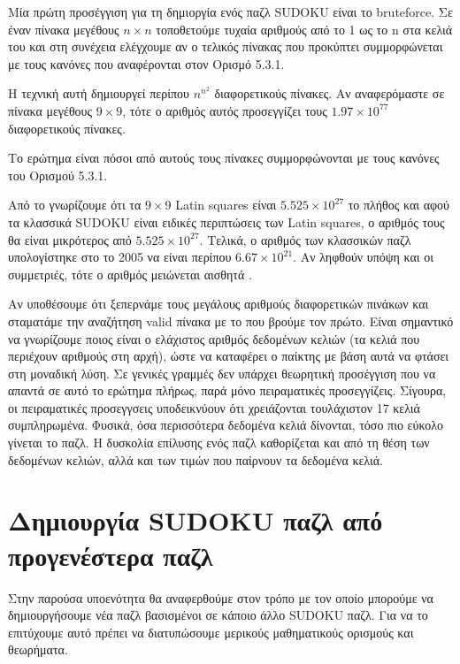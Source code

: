 \documentclass[12pt]{book}
\theoremstyle{definition}
\begin{document}
Μία πρώτη προσέγγιση για τη δημιοργία ενός παζλ SUDOKU είναι το bruteforce. Σε έναν πίνακα μεγέθους \(n \times n\) τοποθετούμε τυχαία αριθμούς από το 1 ως το n στα κελιά του και στη συνέχεια ελέγχουμε αν ο τελικός πίνακας που προκύπτει συμμορφώνεται με τους κανόνες που αναφέρονται στον Ορισμό 5.3.1. \par

Η τεχνική αυτή δημιουργεί περίπου \(n^{n^2}\) διαφορετικούς πίνακες. Αν αναφερόμαστε σε πίνακα μεγέθους \(9 \times 9\), τότε ο αριθμός αυτός προσεγγίζει τους \(1.97\times10^{77}\) διαφορετικούς πίνακες. \par

Το ερώτημα είναι πόσοι από αυτούς τους πίνακες συμμορφώνονται με τους κανόνες του Ορισμού 5.3.1. \par

Από το \cite{6} γνωρίζουμε ότι τα \(9 \times 9\) Latin squares είναι \(5.525\times10^{27}\) το πλήθος και αφού τα κλασσικά SUDOKU είναι ειδικές περιπτώσεις των Latin squares, ο αριθμός τους θα είναι μικρότερος από \(5.525\times10^{27}\). Τελικά, ο αριθμός των κλασσικών παζλ υπολογίστηκε στο \cite{7} το 2005 να είναι περίπου \(6.67\times10^{21}\). Αν ληφθούν υπόψη και οι συμμετριές, τότε ο αριθμός μειώνεται αισθητά \cite{8}.

Αν υποθέσουμε ότι ξεπερνάμε τους μεγάλους αριθμούς διαφορετικών πινάκων και σταματάμε την αναζήτηση valid πίνακα με το που βρούμε τον πρώτο. Είναι σημαντικό να γνωρίζουμε ποιος είναι ο ελάχιστος αριθμός δεδομένων κελιών (τα κελιά που περιέχουν αριθμούς στη αρχή), ώστε να καταφέρει ο παίκτης με βάση αυτά να φτάσει στη μοναδική λύση. Σε γενικές γραμμές δεν υπάρχει θεωρητική προσέγγιση που να απαντά σε αυτό το ερώτημα πλήρως, παρά μόνο πειραματικές προσεγγίζεις. Σίγουρα, οι πειραματικές προσεγγσεις υποδεικνύουν ότι χρειάζονται τουλάχιστον 17 κελιά συμπληρωμένα. Φυσικά, όσα περισσότερα δεδομένα κελιά δίνονται, τόσο πιο εύκολο γίνεται το παζλ. Η δυσκολία επίλυσης ενός παζλ καθορίζεται και από τη θέση των δεδομένων κελιών, αλλά και των τιμών που παίρνουν τα δεδομένα κελιά.

\section{Δημιουργία SUDOKU παζλ από προγενέστερα παζλ}

Στην παρούσα υποενότητα θα αναφερθούμε στον τρόπο με τον οποίο μπορούμε να δημιουργήσουμε νέα παζλ βασισμένοι σε κάποιο άλλο SUDOKU παζλ. Για να το επιτύχουμε αυτό πρέπει να διατυπώσουμε μερικούς μαθηματικούς ορισμούς και θεωρήματα. \par
\end{document}
